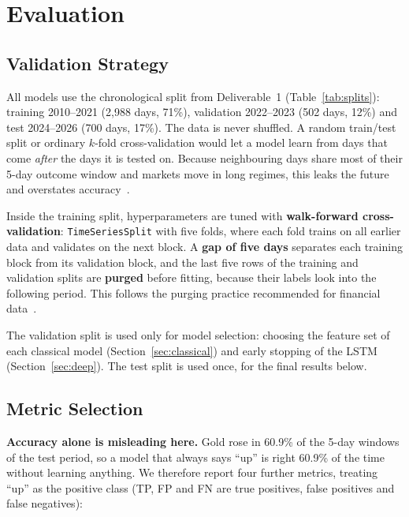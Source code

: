 \section{Evaluation}
\label{sec:evaluation}

\subsection{Validation Strategy}

All models use the chronological split from Deliverable~1
(Table~\ref{tab:splits}): training 2010--2021 (2,988 days, 71\%), validation
2022--2023 (502 days, 12\%) and test 2024--2026 (700 days, 17\%). The data is
never shuffled. A random train/test split or ordinary $k$-fold
cross-validation would let a model learn from days that come \emph{after} the
days it is tested on. Because neighbouring days share most of their 5-day
outcome window and markets move in long regimes, this leaks the future and
overstates accuracy~\cite{a_bergmeir2012}.

Inside the training split, hyperparameters are tuned with \textbf{walk-forward
cross-validation}: \texttt{TimeSeriesSplit} with five folds, where each fold
trains on all earlier data and validates on the next block. A \textbf{gap of
five days} separates each training block from its validation block, and the
last five rows of the training and validation splits are \textbf{purged} before
fitting, because their labels look into the following period. This follows the
purging practice recommended for financial data~\cite{a_lopezdeprado2018}.

The validation split is used only for model selection: choosing the feature set
of each classical model (Section~\ref{sec:classical}) and early stopping of the
LSTM (Section~\ref{sec:deep}). The test split is used once, for the final
results below.

\subsection{Metric Selection}

\textbf{Accuracy alone is misleading here.} Gold rose in 60.9\% of the 5-day
windows of the test period, so a model that always says ``up'' is right 60.9\%
of the time without learning anything. We therefore report four further metrics,
treating ``up'' as the positive class (TP, FP and FN are true positives, false
positives and false negatives):

